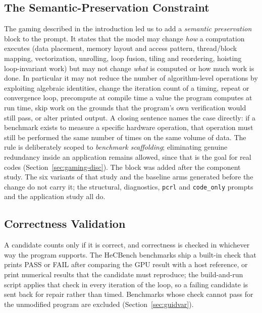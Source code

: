 \subsection{The Semantic-Preservation Constraint}
\label{sec:constraint}
The gaming described in the introduction led us to add a \emph{semantic preservation} block to the
prompt. It states that the model may change \emph{how} a computation executes (data placement, memory
layout and access pattern, thread/block mapping, vectorization, unrolling, loop fusion, tiling and
reordering, hoisting loop-invariant work) but may not change \emph{what} is computed or how much work
is done. In particular it may not reduce the number of algorithm-level operations by exploiting
algebraic identities, change the iteration count of a timing, repeat or convergence loop, precompute at
compile time a value the program computes at run time, skip work on the grounds that the program's own
verification would still pass, or alter printed output. A closing sentence names the case directly: if
a benchmark exists to measure a specific hardware operation, that operation must still be performed the
same number of times on the same volume of data. The rule is deliberately scoped to \emph{benchmark
scaffolding}; eliminating genuine redundancy inside an application remains allowed, since that is the
goal for real codes (Section~\ref{sec:gaming-disc}). The block was added after the component study.
The six variants of that study and the baseline arms generated before the change do not carry it;
the structural, diagnostics, \texttt{pcrl} and \texttt{code\_only} prompts and the application study
all do.

\subsection{Correctness Validation}
\label{sec:correctness}
A candidate counts only if it is correct, and correctness is checked in whichever way the program
supports. The HeCBench benchmarks ship a built-in check that prints PASS or FAIL after comparing the
GPU result with a host reference, or print numerical results that the candidate must reproduce; the
build-and-run script applies that check in every iteration of the loop, so a failing candidate is sent
back for repair rather than timed. Benchmarks whose check cannot pass for the unmodified program are
excluded (Section~\ref{sec:guidvar}).

